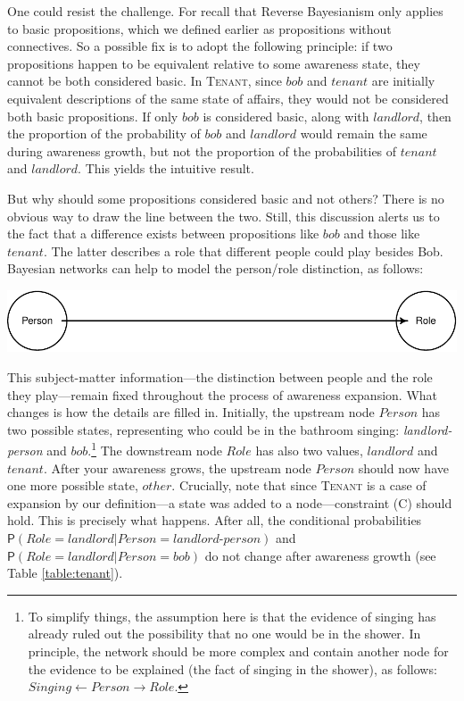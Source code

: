 \documentclass[
  11pt,
  dvipsnames,enabledeprecatedfontcommands, todos]{scrartcl}
\newcommand{\pr}[1]{\ensuremath{\mathsf{P}(#1)}}
\begin{document}
One could resist the challenge. For recall that Reverse Bayesianism only
applies to basic propositions, which we defined earlier as propositions
without connectives. So a possible fix is to adopt the following
principle: if two propositions happen to be equivalent relative to some
awareness state, they cannot be both considered basic. In
\textsc{Tenant}, since \(bob\) and \(tenant\) are initially equivalent
descriptions of the same state of affairs, they would not be considered
both basic propositions. If only \(bob\) is considered basic, along with
\(landlord\), then the proportion of the probability of \(bob\) and
\(landlord\) would remain the same during awareness growth, but not the
proportion of the probabilities of \(tenant\) and \(landlord\). This
yields the intuitive result.

But why should some propositions considered basic and not others? There
is no obvious way to draw the line between the two. Still, this
discussion alerts us to the fact that a difference exists between
propositions like \(bob\) and those like \(tenant\). The latter
describes a role that different people could play besides Bob. Bayesian
networks can help to model the person/role distinction, as follows:

\begin{center}\includegraphics[width=0.5\linewidth,height=0.3\textheight]{ReplyToSteeleStefansson5_files/figure-latex/tenantsDAG-new-1} \end{center}

\noindent This subject-matter information---the distinction between
people and the role they play---remain fixed throughout the process of
awareness expansion. What changes is how the details are filled in.
Initially, the upstream node \(Person\) has two possible states,
representing who could be in the bathroom singing:
\textit{landlord-person} and \(bob\).\footnote{To simplify things, the
  assumption here is that the evidence of singing has already ruled out
  the possibility that no one would be in the shower. In principle, the
  network should be more complex and contain another node for the
  evidence to be explained (the fact of singing in the shower), as
  follows:
  \(\textit{Singing}\leftarrow\textit{Person}\rightarrow \textit{Role}\).}
The downstream node \(Role\) has also two values, \(landlord\) and
\(tenant\). After your awareness grows, the upstream node \(Person\)
should now have one more possible state, \(other\). Crucially, note that
since \textsc{Tenant} is a case of expansion by our definition---a state
was added to a node---constraint (C) should hold. This is precisely what
happens. After all, the conditional probabilities
\(\pr{\textit{Role}=\textit{landlord} \vert \textit{Person}=\textit{landlord-person}}\)
and
\(\pr{\textit{Role}=\textit{landlord} \vert \textit{Person}=\textit{bob}}\)
do not change after awareness growth (see Table \ref{table:tenant}).
\end{document}
